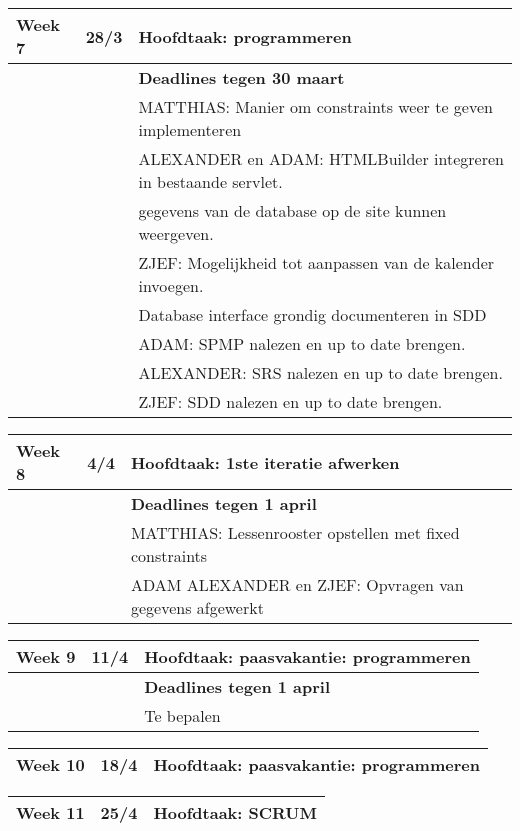 \documentclass{article}
\begin{document}
\begin{center}
\begin{tabular}[t]{|p{1.3cm}|p{0.8cm}|p{9cm}|}
\hline
Week 7	& 28/3 &	\textbf{Hoofdtaak:} programmeren \\
\hline
 & & \textbf{Deadlines tegen 30 maart} \\
 & & MATTHIAS: Manier om constraints weer te geven implementeren \\
 & & ALEXANDER en ADAM: HTMLBuilder integreren in bestaande servlet. \\
 & & gegevens van de database op de site kunnen weergeven. \\
 & & ZJEF: Mogelijkheid tot aanpassen van de kalender invoegen. \\
 & & Database interface grondig documenteren in SDD \\
 & & ADAM: SPMP nalezen en up to date brengen. \\
 & & ALEXANDER: SRS nalezen en up to date brengen. \\
 & & ZJEF: SDD nalezen en up to date brengen. \\
\hline
\end{tabular}

\begin{tabular}[t]{|p{1.3cm}|p{0.8cm}|p{9cm}|}
\hline
Week 8	& 4/4 &	\textbf{Hoofdtaak:} 1ste iteratie afwerken  \\
\hline
\hline
 & & \textbf{Deadlines tegen 1 april} \\
 & & MATTHIAS: Lessenrooster opstellen met fixed constraints \\
 & & ADAM ALEXANDER en ZJEF: Opvragen van gegevens afgewerkt \\
\hline 
\end{tabular}

\begin{tabular}[t]{|p{1.3cm}|p{0.8cm}|p{9cm}|}
Week 9	 & 11/4 &	\textbf{Hoofdtaak:} paasvakantie: programmeren \\
\hline
\hline
 & & \textbf{Deadlines tegen 1 april} \\
 & & Te bepalen \\
\hline
\end{tabular}

\begin{tabular}[t]{|p{1.3cm}|p{0.8cm}|p{9cm}|}
\hline
Week 10 & 18/4 &	\textbf{Hoofdtaak:} paasvakantie: programmeren \\
\hline
\end{tabular}

\begin{tabular}[t]{|p{1.3cm}|p{0.8cm}|p{9cm}|}
\hline
Week 11 & 25/4 &	\textbf{Hoofdtaak:} SCRUM \\
\hline
\end{tabular}


\end{center}
\end{document}
